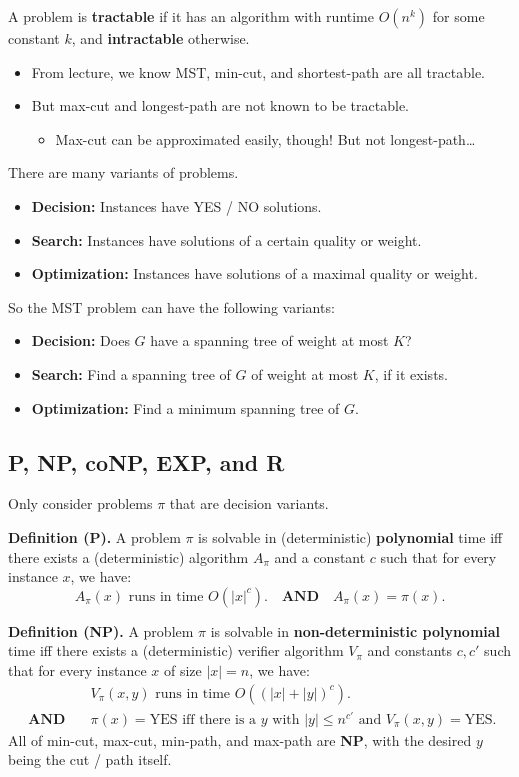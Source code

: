 A problem is \textbf{tractable} if it has an algorithm with runtime $O(n^k)$ for some constant $k$, and \textbf{intractable} otherwise.
\begin{itemize}
    \item From lecture, we know MST, min-cut, and shortest-path are all tractable.
    \item But max-cut and longest-path are not known to be tractable.
    \begin{itemize}
        \item Max-cut can be approximated easily, though!  But not longest-path\dots
    \end{itemize}
\end{itemize}
There are many variants of problems.
\begin{itemize}
    \item \textbf{Decision:} Instances have YES / NO solutions.
    \item \textbf{Search:} Instances have solutions of a certain quality or weight.
    \item \textbf{Optimization:} Instances have solutions of a maximal quality or weight.
\end{itemize}
So the MST problem can have the following variants:
\begin{itemize}
    \item \textbf{Decision:} Does $G$ have a spanning tree of weight at most $K$?
    \item \textbf{Search:} Find a spanning tree of $G$ of weight at most $K$, if it exists.
    \item \textbf{Optimization:} Find a minimum spanning tree of $G$.
\end{itemize}

\subsection{P, NP, coNP, EXP, and R}

Only consider problems $\pi$ that are decision variants.

\textbf{Definition (P).} A problem $\pi$ is solvable in (deterministic) \textbf{polynomial} time iff there exists a (deterministic) algorithm $A_{\pi}$ and a constant $c$ such that for every instance $x$, we have:
\[ A_{\pi}(x) \text{ runs in time } O(|x|^c). ~~~ \textbf{ AND } ~~~ A_{\pi}(x) = \pi(x). \]

\textbf{Definition (NP).} A problem $\pi$ is solvable in \textbf{non-deterministic polynomial} time iff there exists a (deterministic) verifier algorithm $V_{\pi}$ and constants $c, c'$ such that for every instance $x$ of size $|x| = n$, we have:
\begin{align*}
& V_{\pi}(x, y) \text{ runs in time } O((|x| + |y|)^c). \\
\textbf{ AND } ~~~ & \pi(x) = \text{YES} \text{ iff there is a } y \text{ with } |y| \leq n^{c'} \text{ and } V_{\pi}(x, y) = \text{YES}. \end{align*}
All of min-cut, max-cut, min-path, and max-path are \textbf{NP}, with the desired $y$ being the cut / path itself.

